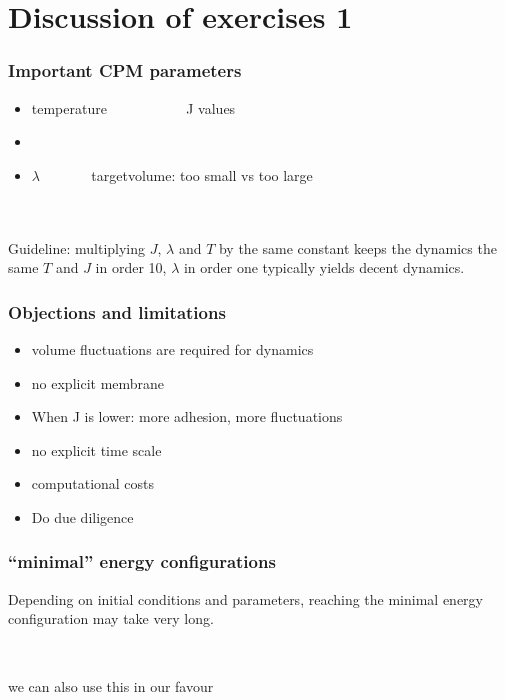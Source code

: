 \documentclass[compress]{beamer}
\begin{document}
 
\section{Discussion of exercises 1}
\begin{frame}
\frametitle{Important CPM parameters}
\begin{itemize}
 \item temperature  ~~~~~~~~~~  J values %
 \item ~
 \item $\lambda$ ~~    ~~~~targetvolume: too small vs too large %
\end{itemize}
\leavevmode
\\~\\
Guideline: multiplying $J$, $\lambda$ and $T$ by the same constant keeps the dynamics the same 
$T$ and $J$ in order 10, $\lambda$ in order one typically yields decent dynamics.\\
\end{frame}

\begin{frame}
\frametitle{Objections and limitations}
\begin{itemize}
 \item volume fluctuations are required for dynamics %
 \item no explicit membrane
 \item When J is lower: more adhesion, more fluctuations
 \item no explicit time scale
 \item computational costs
 \item Do due diligence
\end{itemize}

\end{frame}


\begin{frame}
\frametitle{``minimal'' energy configurations}   
Depending on initial conditions and parameters, reaching the minimal energy configuration may take very long.
\begin{center}
 \\
\end{center}
we can also use this in our favour
\end{frame}
\end{document}
